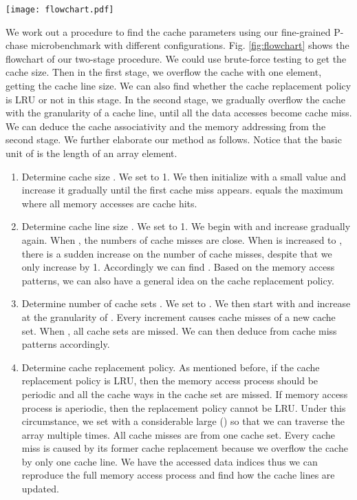 \documentclass[10pt,journal,compsoc]{IEEEtran}
\theoremstyle{definition}
\begin{document}
\begin{figure*}
  \centering
\texttt{[image: flowchart.pdf]}
  \caption{Flowchart of applying fine-grained P-chase.}\label{fig:flowchart}
\end{figure*}


We work out a procedure to find the cache parameters using our fine-grained P-chase microbenchmark with different  configurations. Fig. \ref{fig:flowchart} shows the flowchart of our two-stage procedure. We could use brute-force  testing to get the cache size. Then in the first stage, we overflow the cache with one element, getting the cache line size. We can also find whether the cache replacement policy is LRU or not in this stage. In the second stage, we gradually overflow the cache with the granularity of a cache line, until all the data accesses become cache miss. We can deduce the cache associativity and the memory addressing from the second stage. We further elaborate our method as follows. Notice that the basic unit of  is the length of an array element.

\begin{enumerate}
\item Determine cache size . We set  to 1. We then initialize  with a small value and increase it gradually until the first cache miss appears.  equals the maximum  where all memory accesses are cache hits.
\item Determine cache line size . We set  to 1. We begin with  and increase  gradually again. When , the numbers of cache misses are close. When  is increased to , there is a sudden increase on the number of cache misses, despite that we only increase  by 1. Accordingly we can find . Based on the memory access patterns, we can also have a general idea on the cache replacement policy.
\item Determine number of cache sets . We set  to . We then start with  and increase  at the granularity of . Every increment causes cache misses of a new cache set. When , all cache sets are missed. We can then deduce  from cache miss patterns accordingly.
\item Determine cache replacement policy. As mentioned before, if the cache replacement policy is LRU, then the memory access process should be periodic and all the cache ways in the cache set are missed. If memory access process is aperiodic, then the replacement policy cannot be LRU. Under this circumstance, we set  with a considerable large  () so that we can traverse the array multiple times. All cache misses are from one cache set. Every cache miss is caused by its former cache replacement because we overflow the cache by only one cache line. We have the accessed data indices thus we can reproduce the full memory access process and find how the cache lines are updated.
\end{enumerate}
\end{document}
